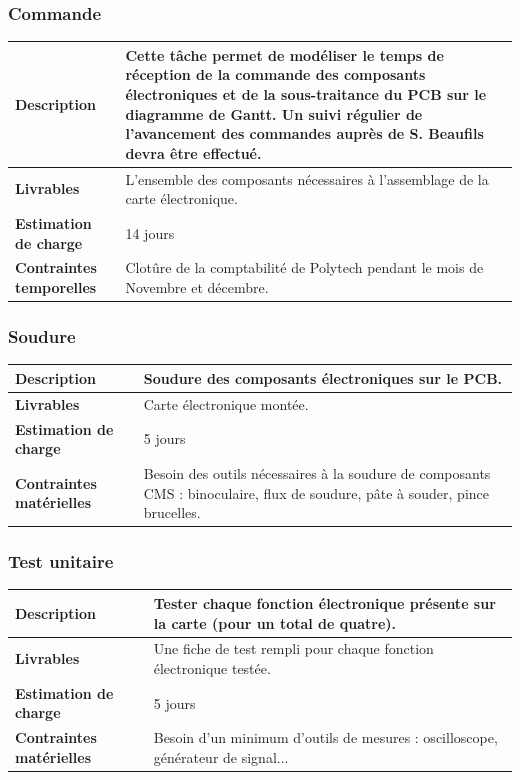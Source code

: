 \subsubsection{Commande}

\begin{tabularx}{13cm}{lX}
    \toprule
        \textbf{Description} &
        Cette tâche permet de modéliser le temps de réception de la commande des composants électroniques et de la sous-traitance du PCB sur le diagramme de Gantt.
        Un suivi régulier de l'avancement des commandes auprès de S. Beaufils devra être effectué.\\
    \midrule
        \textbf{Livrables} &
        L'ensemble des composants nécessaires à l'assemblage de la carte électronique. \\
    \midrule
        \textbf{Estimation de charge} &
        14 jours \\
    \midrule
        \textbf{Contraintes temporelles} &
        Clotûre de la comptabilité de Polytech pendant le mois de Novembre et décembre. \\
    \bottomrule
\end{tabularx}

\subsubsection{Soudure}

\begin{tabularx}{13cm}{lX}
    \toprule
        \textbf{Description} &
        Soudure des composants électroniques sur le PCB. \\
    \midrule
        \textbf{Livrables} &
        Carte électronique montée. \\
    \midrule
        \textbf{Estimation de charge} &
        5 jours \\
    \midrule
        \textbf{Contraintes matérielles} &
        Besoin des outils nécessaires à la soudure de composants CMS : binoculaire, flux de soudure, pâte à souder, pince brucelles. \\
    \bottomrule
\end{tabularx}

\subsubsection{Test unitaire}

\begin{tabularx}{13cm}{lX}
    \toprule
        \textbf{Description} &
        Tester chaque fonction électronique présente sur la carte (pour un total de quatre). \\
    \midrule
        \textbf{Livrables} &
        Une fiche de test rempli pour chaque fonction électronique testée. \\
    \midrule
        \textbf{Estimation de charge} &
        5 jours \\
    \midrule
        \textbf{Contraintes matérielles} &
        Besoin d'un minimum d'outils de mesures : oscilloscope, générateur de signal... \\
    \bottomrule
\end{tabularx}


